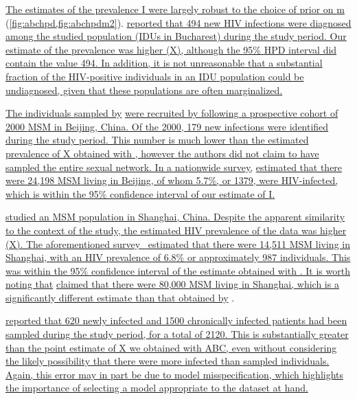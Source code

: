 {\color{blue}\uline{
The estimates of the prevalence \gls{I} were largely robust to the choice of
prior on \gls{m}} (\cref{fig:abchpd,fig:abchpdm2}).
\textcite{niculescu2015recent} \uline{reported that 494 new HIV infections were
diagnosed among the studied population (\glspl{IDU} in Bucharest) during the
study period. Our estimate of the prevalence was higher (X), although the 95\%
\gls{HPD} interval did contain the value 494. In addition, it is not
unreasonable that a substantial fraction of the \gls{HIV}-positive individuals
in an \gls{IDU} population could be undiagnosed, given that these populations
are often marginalized.}

\uline{The individuals sampled by} \textcite{wang2015targeting} \uline{were
recruited by following a prospective cohort of 2000 \gls{MSM} in Beijing,
China. Of the 2000, 179 new infections were identified during the study period.
This number is much lower than the estimated prevalence of X obtained with
, however the authors did not claim to have sampled the entire
sexual network. In a nationwide survey,} \textcite{wu2013hiv} \uline{estimated
that there were 24,198 \gls{MSM} living in Beijing, of whom 5.7\%, or 1379,
were \gls{HIV}-infected, which is within the 95\% confidence interval of our
estimate of \gls{I}.}

\textcite{li2015hiv} \uline{studied an \gls{MSM} population in Shanghai, China.
Despite the apparent similarity to the context of the
}\textcite{wang2015targeting} \uline{study, the estimated \gls{HIV} prevalence
of the } \citeauthor{li2015hiv} \uline{data was higher (X). The aforementioned
survey~\autocite{wu2013hiv} estimated that there were 14,511 \gls{MSM} living
in Shanghai, with an \gls{HIV} prevalence of 6.8\% or approximately 987
individuals. This was within the 95\% confidence interval of the estimate
obtained with . It is worth noting that} \citeauthor{li2015hiv}
\uline{claimed that there were 80,000 \gls{MSM} living in Shanghai, which is a
significantly different estimate than that obtained by} \textcite{wu2013hiv}.

\textcite{cuevas2009hiv} \uline{reported that 620 newly infected and 1500
chronically infected patients had been sampled during the study period, for a
total of 2120. This is substantially greater than the point estimate of X we
obtained with \gls{ABC}, even without considering the likely possibility that
there were more infected than sampled individuals. Again, this error may in
part be due to model misspecification, which highlights the importance of
selecting a model appropriate to the dataset at hand.} }

